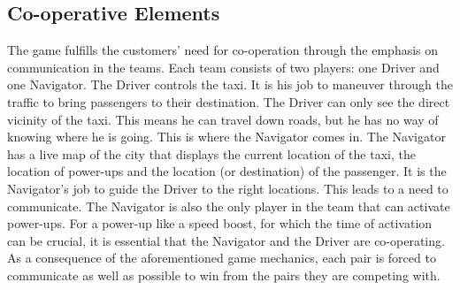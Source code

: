 \subsection{Co-operative Elements}
The game fulfills the customers' need for co-operation through the emphasis on communication in the teams. Each team consists of two players: one Driver and one Navigator. The Driver controls the taxi. It is his job to maneuver through the traffic to bring passengers to their destination. The Driver can only see the direct vicinity of the taxi. This means he can travel down roads, but he has no way of knowing where he is going. This is where the Navigator comes in. The Navigator has a live map of the city that displays the current location of the taxi, the location of power-ups and the location (or destination) of the passenger. It is the Navigator's job to guide the Driver to the right locations. This leads to a need to communicate. The Navigator is also the only player in the team that can activate power-ups. For a power-up like a speed boost, for which the time of activation can be crucial, it is essential that the Navigator and the Driver are co-operating. As a consequence of the aforementioned game mechanics, each pair is forced to communicate as well as possible to win from the pairs they are competing with.


